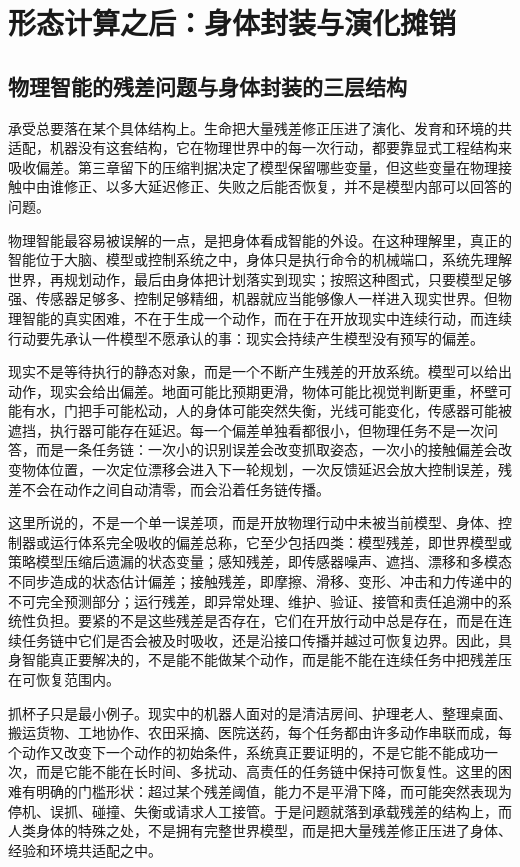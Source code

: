 \section{形态计算之后：身体封装与演化摊销}

\subsection{物理智能的残差问题与身体封装的三层结构}

承受总要落在某个具体结构上。生命把大量残差修正压进了演化、发育和环境的共适配，机器没有这套结构，它在物理世界中的每一次行动，都要靠显式工程结构来吸收偏差。第三章留下的压缩判据决定了模型保留哪些变量，但这些变量在物理接触中由谁修正、以多大延迟修正、失败之后能否恢复，并不是模型内部可以回答的问题。

物理智能最容易被误解的一点，是把身体看成智能的外设。在这种理解里，真正的智能位于大脑、模型或控制系统之中，身体只是执行命令的机械端口，系统先理解世界，再规划动作，最后由身体把计划落实到现实；按照这种图式，只要模型足够强、传感器足够多、控制足够精细，机器就应当能够像人一样进入现实世界。但物理智能的真实困难，不在于生成一个动作，而在于在开放现实中连续行动，而连续行动要先承认一件模型不愿承认的事：现实会持续产生模型没有预写的偏差。


现实不是等待执行的静态对象，而是一个不断产生残差的开放系统。模型可以给出动作，现实会给出偏差。地面可能比预期更滑，物体可能比视觉判断更重，杯壁可能有水，门把手可能松动，人的身体可能突然失衡，光线可能变化，传感器可能被遮挡，执行器可能存在延迟。每一个偏差单独看都很小，但物理任务不是一次问答，而是一条任务链：一次小的识别误差会改变抓取姿态，一次小的接触偏差会改变物体位置，一次定位漂移会进入下一轮规划，一次反馈延迟会放大控制误差，残差不会在动作之间自动清零，而会沿着任务链传播。

这里所说的，不是一个单一误差项，而是开放物理行动中未被当前模型、身体、控制器或运行体系完全吸收的偏差总称，它至少包括四类：模型残差，即世界模型或策略模型压缩后遗漏的状态变量；感知残差，即传感器噪声、遮挡、漂移和多模态不同步造成的状态估计偏差；接触残差，即摩擦、滑移、变形、冲击和力传递中的不可完全预测部分；运行残差，即异常处理、维护、验证、接管和责任追溯中的系统性负担。要紧的不是这些残差是否存在，它们在开放行动中总是存在，而是在连续任务链中它们是否会被及时吸收，还是沿接口传播并越过可恢复边界。因此，具身智能真正要解决的，不是能不能做某个动作，而是能不能在连续任务中把残差压在可恢复范围内。

抓杯子只是最小例子。现实中的机器人面对的是清洁房间、护理老人、整理桌面、搬运货物、工地协作、农田采摘、医院送药，每个任务都由许多动作串联而成，每个动作又改变下一个动作的初始条件，系统真正要证明的，不是它能不能成功一次，而是它能不能在长时间、多扰动、高责任的任务链中保持可恢复性。这里的困难有明确的门槛形状：超过某个残差阈值，能力不是平滑下降，而可能突然表现为停机、误抓、碰撞、失衡或请求人工接管。于是问题就落到承载残差的结构上，而人类身体的特殊之处，不是拥有完整世界模型，而是把大量残差修正压进了身体、经验和环境共适配之中。

